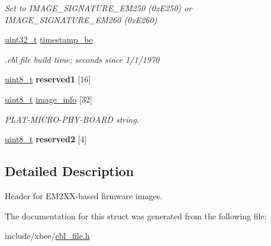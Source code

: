 \begin{DoxyCompactItemize}
\begin{DoxyCompactList}\small\item\em Set to I\-M\-A\-G\-E\-\_\-\-S\-I\-G\-N\-A\-T\-U\-R\-E\-\_\-\-E\-M250 (0x\-E250) or I\-M\-A\-G\-E\-\_\-\-S\-I\-G\-N\-A\-T\-U\-R\-E\-\_\-\-E\-M260 (0x\-E260) \end{DoxyCompactList}\item 
\hypertarget{structem2xx__header__t_afaf8e4e20237cd48cb6ad845b1fc67b7}{\hyperlink{group__hal__dos_ga09a1e304d66d35dd47daffee9731edaa}{uint32\-\_\-t} \hyperlink{structem2xx__header__t_afaf8e4e20237cd48cb6ad845b1fc67b7}{timestamp\-\_\-be}}\label{structem2xx__header__t_afaf8e4e20237cd48cb6ad845b1fc67b7}

\begin{DoxyCompactList}\small\item\em .ebl file build time; seconds since 1/1/1970 \end{DoxyCompactList}\item 
\hypertarget{structem2xx__header__t_a8e07eb5bce4108d254f2dddbeee7c5e2}{\hyperlink{group__hal_gae1affc9ca37cfb624959c866a73f83c2}{uint8\-\_\-t} {\bfseries reserved1} \mbox{[}16\mbox{]}}\label{structem2xx__header__t_a8e07eb5bce4108d254f2dddbeee7c5e2}

\item 
\hypertarget{structem2xx__header__t_ac8e0e93c0a3fec6ad01c8d1ff930ff3a}{\hyperlink{group__hal_gae1affc9ca37cfb624959c866a73f83c2}{uint8\-\_\-t} \hyperlink{structem2xx__header__t_ac8e0e93c0a3fec6ad01c8d1ff930ff3a}{image\-\_\-info} \mbox{[}32\mbox{]}}\label{structem2xx__header__t_ac8e0e93c0a3fec6ad01c8d1ff930ff3a}

\begin{DoxyCompactList}\small\item\em P\-L\-A\-T-\/\-M\-I\-C\-R\-O-\/\-P\-H\-Y-\/\-B\-O\-A\-R\-D string. \end{DoxyCompactList}\item 
\hypertarget{structem2xx__header__t_a3d0f8c07755dd4ed0c7d63d3e04e8c93}{\hyperlink{group__hal_gae1affc9ca37cfb624959c866a73f83c2}{uint8\-\_\-t} {\bfseries reserved2} \mbox{[}4\mbox{]}}\label{structem2xx__header__t_a3d0f8c07755dd4ed0c7d63d3e04e8c93}

\end{DoxyCompactItemize}


\subsection{Detailed Description}
Header for E\-M2\-X\-X-\/based firmware images. 

The documentation for this struct was generated from the following file\-:\begin{DoxyCompactItemize}
\item 
include/xbee/\hyperlink{ebl__file_8h}{ebl\-\_\-file.\-h}\end{DoxyCompactItemize}
